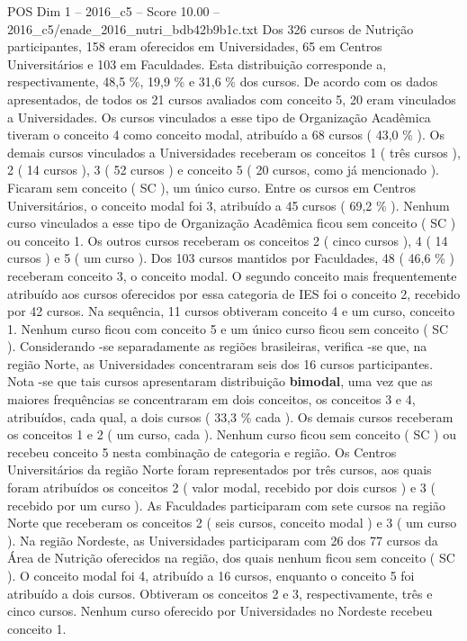 \begin{textsample}{POS Dim 1 – 2016\_c5 – Score 10.00 – 2016\_c5/enade\_2016\_nutri\_bdb42b9b1c.txt}
Dos 326 cursos de Nutrição participantes, 158 eram oferecidos em Universidades, 65 em Centros Universitários e 103 em Faculdades.
Esta distribuição corresponde a, respectivamente, 48,5 \%, 19,9 \% e 31,6 \% dos cursos.
De acordo com os dados apresentados, de todos os 21 cursos avaliados com conceito 5, 20 eram vinculados a Universidades.
Os cursos vinculados a esse tipo de Organização Acadêmica tiveram o conceito 4 como conceito modal, atribuído a 68 cursos ( 43,0 \% ).
Os demais cursos vinculados a Universidades receberam os conceitos 1 ( três cursos ), 2 ( 14 cursos ), 3 ( 52 cursos ) e conceito 5 ( 20 cursos, como já mencionado ).
Ficaram sem conceito ( SC ), um único curso.
Entre os cursos em Centros Universitários, o conceito modal foi 3, atribuído a 45 cursos ( 69,2 \% ).
Nenhum curso vinculados a esse tipo de Organização Acadêmica ficou sem conceito ( SC ) ou conceito 1.
Os outros cursos receberam os conceitos 2 ( cinco cursos ), 4 ( 14 cursos ) e 5 ( um curso ).
Dos 103 cursos mantidos por Faculdades, 48 ( 46,6 \% ) receberam conceito 3, o conceito modal.
O segundo conceito mais frequentemente atribuído aos cursos oferecidos por essa categoria de IES foi o conceito 2, recebido por 42 cursos.
Na sequência, 11 cursos obtiveram conceito 4 e um curso, conceito 1.
Nenhum curso ficou com conceito 5 e um único curso ficou sem conceito ( SC ).
Considerando -se separadamente as regiões brasileiras, verifica -se que, na região Norte, as Universidades concentraram seis dos 16 cursos participantes.
Nota -se que tais cursos apresentaram distribuição \textbf{bimodal}, uma vez que as maiores frequências se concentraram em dois conceitos, os conceitos 3 e 4, atribuídos, cada qual, a dois cursos ( 33,3 \% cada ).
Os demais cursos receberam os conceitos 1 e 2 ( um curso, cada ).
Nenhum curso ficou sem conceito ( SC ) ou recebeu conceito 5 nesta combinação de categoria e região.
Os Centros Universitários da região Norte foram representados por três cursos, aos quais foram atribuídos os conceitos 2 ( valor modal, recebido por dois cursos ) e 3 ( recebido por um curso ).
As Faculdades participaram com sete cursos na região Norte que receberam os conceitos 2 ( seis cursos, conceito modal ) e 3 ( um curso ).
Na região Nordeste, as Universidades participaram com 26 dos 77 cursos da Área de Nutrição oferecidos na região, dos quais nenhum ficou sem conceito ( SC ).
O conceito modal foi 4, atribuído a 16 cursos, enquanto o conceito 5 foi atribuído a dois cursos.
Obtiveram os conceitos 2 e 3, respectivamente, três e cinco cursos.
Nenhum curso oferecido por Universidades no Nordeste recebeu conceito 1.

\end{textsample}
